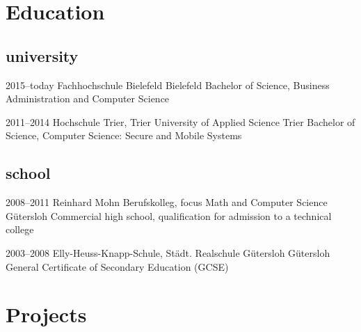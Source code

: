 \documentclass[]{friggeri-cv} %
\begin{document}
\section{Education}

\subsection{university}

\begin{entrylist}
	
	\entry
	{2015--today}
	{Fachhochschule Bielefeld}
	{Bielefeld}
	{Bachelor of Science, Business Administration and Computer Science}
	
	
	\entry
	{2011--2014}
	{Hochschule Trier, Trier University of Applied Science}
	{Trier}
	{Bachelor of Science, Computer Science: Secure and Mobile Systems}
	
	
\end{entrylist}

\subsection{school}

\begin{entrylist}
	
	\entry
	{2008--2011}
	{Reinhard Mohn Berufskolleg, focus Math and Computer Science}
	{G\"{u}tersloh}
	{Commercial high school, qualification for admission to a technical college}
	
	
	\entry
	{2003--2008}
	{Elly-Heuss-Knapp-Schule, St\"{a}dt. Realschule G\"{u}tersloh}
	{G\"{u}tersloh}
	{General Certificate of Secondary Education (GCSE)}
	
	
\end{entrylist}


\pagebreak


\section{Projects}
\end{document}
